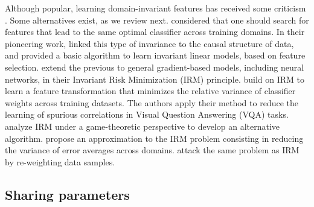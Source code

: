 \documentclass{article}
\begin{document}
Although popular, learning domain-invariant features has received some criticism \citep{zhao2019learning, johansson2019support}. Some alternatives exist, as we review next.
\citet{peters2016causal, rojas2018invariant} considered that one should search for features that lead to the same optimal classifier across training domains. In their pioneering work, \citet{peters2016causal} linked this type of invariance to the causal structure of data, and provided a basic algorithm to learn invariant linear models, based on feature selection.
\citet{arjovsky2019invariant} extend the previous to general gradient-based models, including neural networks, in their Invariant Risk Minimization (IRM) principle.
\citet{teney2020unshuffling} build on IRM to learn a feature transformation that minimizes the relative variance of classifier weights across training datasets. The authors apply their method to reduce the learning of spurious correlations in Visual Question Answering (VQA) tasks.
\citet{ahuja2020invariant} analyze IRM under a game-theoretic perspective to develop an alternative algorithm.
\citet{krueger2020out} propose an approximation to the IRM problem consisting in reducing the variance of error averages across domains.
\citet{bouvier2019hidden} attack the same problem as IRM by re-weighting data samples.

\subsection{Sharing parameters}
\end{document}
